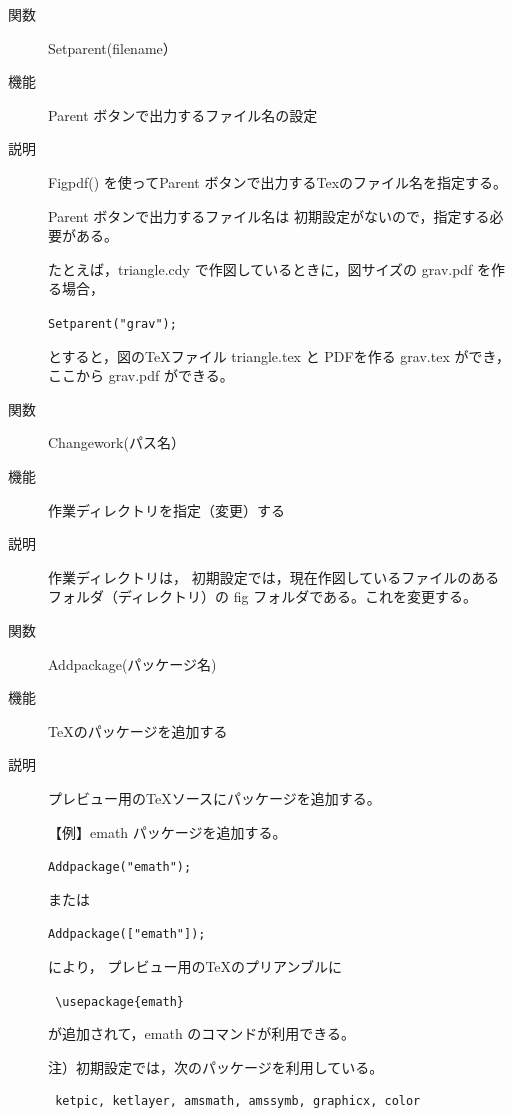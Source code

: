 \documentclass[papersize,a4paper,12pt,uplatex]{jsarticle}
\begin{document}
\begin{description}
\vspace{\baselineskip}
\hypertarget{setparent}{}
\item[関数]  Setparent(filename）
\item[機能]  Parent ボタンで出力するファイル名の設定
\item[説明]  Figpdf() を使ってParent ボタンで出力するTexのファイル名を指定する。

Parent ボタンで出力するファイル名は 初期設定がないので，指定する必要がある。

たとえば，triangle.cdy で作図しているときに，図サイズの grav.pdf を作る場合，

\hspace{10mm}   \verb|Setparent("grav");|

とすると，図のTeXファイル  triangle.tex と PDFを作る grav.tex ができ，ここから grav.pdf ができる。

\vspace{\baselineskip}
\hypertarget{changework}{}
\item[関数]  Changework(パス名）
\item[機能]  作業ディレクトリを指定（変更）する
\item[説明]  作業ディレクトリは， 初期設定では，現在作図しているファイルのあるフォルダ（ディレクトリ）の fig フォルダである。これを変更する。

\vspace{\baselineskip}
\hypertarget{addpackage}{}
\item[関数]  Addpackage(パッケージ名)
\item[機能]  TeXのパッケージを追加する
\item[説明]  プレビュー用のTeXソースにパッケージを追加する。 

\vspace{\baselineskip}
 【例】emath  パッケージを追加する。
 
\hspace{10mm}  \verb|Addpackage("emath"); | 
 
 または
 
\hspace{10mm}  \verb|Addpackage(["emath"]); | 
 
 により，
  プレビュー用のTeXのプリアンブルに
  
\hspace{10mm}  \verb| \usepackage{emath}|

が追加されて，emath のコマンドが利用できる。

\vspace{\baselineskip}
注）初期設定では，次のパッケージを利用している。
\begin{verbatim}
 ketpic, ketlayer, amsmath, amssymb, graphicx, color 
 \end{verbatim}


\end{description}
\end{document}
